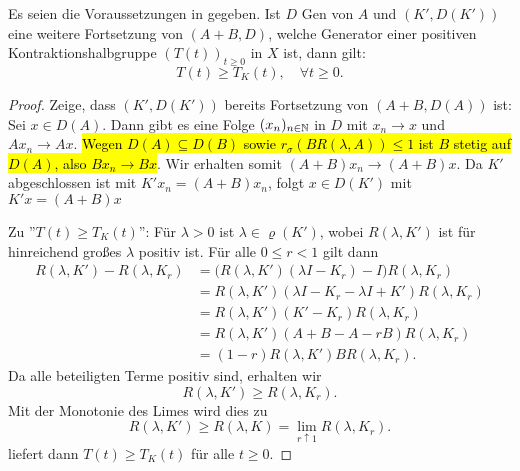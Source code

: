 
\begin{satz}\cite{banasiak_arlotti_2006}\label{Minimalität von K}
Es seien  die Voraussetzungen in  gegeben. Ist $D$ Gen von $A$ und $(K', D(K'))$ eine weitere Fortsetzung von $(A+B, D)$, welche Generator einer  positiven Kontraktionshalbgruppe $(T(t))_{t\geq0}$ in $X$ ist, dann gilt:
\begin{equation*}
T(t)\geq T_K(t),\quad \forall t\geq0.
\end{equation*}
\end{satz}

\begin{proof}
\par 
Zeige, dass $(K', D(K'))$ bereits Fortsetzung von $(A+B, D(A))$ ist: Sei  $x\in D(A)$. Dann gibt es eine Folge $(x_n)_{n\in\mathbb{N}}$ in $D$ mit $x_n \to x$ und $Ax_n\to Ax$.\hl{ Wegen $D(A)\subseteq D(B)$ sowie $r_\sigma(BR(\lambda, A))\leq 1$ ist $B$ stetig auf $D(A)$, also $Bx_n\to Bx$}. Wir erhalten somit $(A+B)x_n\to (A+B)x$. Da $K'$ abgeschlossen ist mit $K'x_n  = (A+B)x_n$, folgt $x\in D(K')$ mit  $K'x=(A+B)x$

\par
Zu ''$T(t)\geq T_K(t)$'': Für $\lambda >0$ ist $\lambda\in \varrho(K')$, wobei $R(\lambda, K')$ ist für hinreichend großes $\lambda$ positiv ist. Für alle $0\leq r <1$ gilt dann
\begin{align*}
R(\lambda, K') - R(\lambda, K_r)
&= \big(R(\lambda, K')(\lambda I- K_r)-I\big)R(\lambda, K_r)\\
&= R(\lambda, K')(\lambda I- K_r - \lambda I+  K')R(\lambda, K_r)\\
&= R(\lambda, K')(K' - K_r)R(\lambda, K_r)\\
&= R(\lambda, K')(A+B - A - rB)R(\lambda, K_r)\\
&= (1-r)R(\lambda, K')BR(\lambda,  K_r).
\end{align*}
Da alle beteiligten Terme positiv sind, erhalten wir
\begin{equation*}
R(\lambda, K')\geq R(\lambda, K_r).
\end{equation*}
Mit der Monotonie des Limes wird dies zu
\begin{equation*}
R(\lambda, K')\geq R(\lambda, K) = \lim_{r\uparrow 1}R(\lambda, K_r).
\end{equation*}
 liefert dann $T(t)\geq T_K(t)$ für alle $t\geq0$.
\end{proof}


